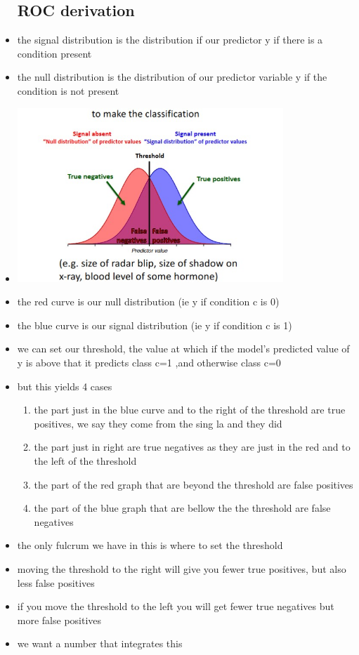 \documentclass{article}
\begin{document}
\begin{itemize}
\subsection{ROC derivation}
\item the signal distribution is the distribution if our predictor y if there is a condition present 
\item the null distribution is the distribution of our predictor variable y if the condition is not present
\item 
\includegraphics[width=10cm]{Final_Review/lecture_10/null_and_signal.jpg}
\item the red curve is our null distribution (ie y if condition c is 0)
\item the blue curve is our signal distribution (ie y if condition c is 1)
\item we can set our threshold, the value at which if the model's predicted value of y is above that it predicts class c=1 ,and otherwise class c=0
\item but this yields 4 cases
\begin{enumerate}
    \item the part just in the blue curve and to the right of the threshold are true positives, we say they come from the sing la and they did 
    \item the part just in right are true negatives as they are just in the red and to the left of the threshold
    \item the part of the red graph that are beyond the threshold are false positives
    \item the part of the blue graph that are bellow the the threshold are false negatives
\end{enumerate}
\item the only fulcrum we have in this is where to set the threshold
\item moving the threshold to the right will give you fewer true positives, but also less false positives 
\item if you move the threshold to the left you will get fewer true negatives but more false positives
\item we want a number that integrates this 

\end{itemize}
\end{document}
